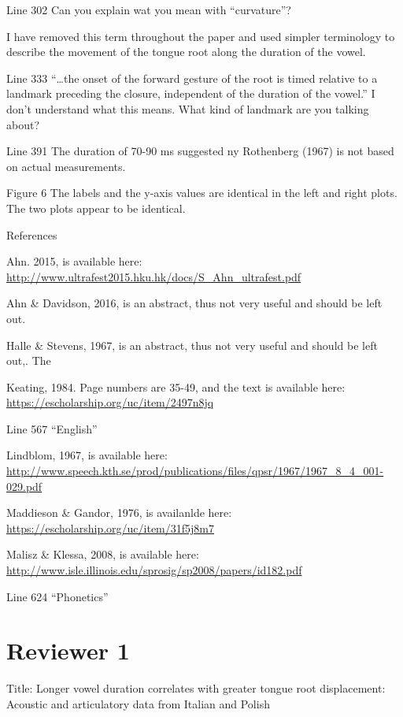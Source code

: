 \documentclass[]{article}
\begin{document}
Line 302 Can you explain wat you mean with ``curvature''?

\color{plum}

I have removed this term throughout the paper and used simpler
terminology to describe the movement of the tongue root along the
duration of the vowel. \color{black}

Line 333 ``\ldots{}the onset of the forward gesture of the root is timed
relative to a landmark preceding the closure, independent of the
duration of the vowel.'' I don't understand what this means. What kind
of landmark are you talking about?

Line 391 The duration of 70-90 ms suggested ny Rothenberg (1967) is not
based on actual measurements.

Figure 6 The labels and the y-axis values are identical in the left and
right plots. The two plots appear to be identical.

References

Ahn. 2015, is available here:
\url{http://www.ultrafest2015.hku.hk/docs/S_Ahn_ultrafest.pdf}

Ahn \& Davidson, 2016, is an abstract, thus not very useful and should
be left out.

Halle \& Stevens, 1967, is an abstract, thus not very useful and should
be left out,. The

Keating, 1984. Page numbers are 35-49, and the text is available here:
\url{https://escholarship.org/uc/item/2497n8jq}

Line 567 ``English''

Lindblom, 1967, is available here:
\url{http://www.speech.kth.se/prod/publications/files/qpsr/1967/1967_8_4_001-029.pdf}

Maddieson \& Gandor, 1976, is availanlde here:
\url{https://escholarship.org/uc/item/31f5j8m7}

Malisz \& Klessa, 2008, is available here:
\url{http://www.isle.illinois.edu/sprosig/sp2008/papers/id182.pdf}

Line 624 ``Phonetics''

\hypertarget{reviewer-1}{%
\section{Reviewer 1}\label{reviewer-1}}

Title: Longer vowel duration correlates with greater tongue root
displacement: Acoustic and articulatory data from Italian and Polish
\end{document}
